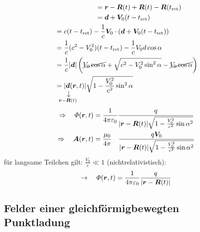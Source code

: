 \begin{enumerate}[i)]
\begin{align*}
	& \qquad \qquad \qquad = \vec{r} - \vec{R}(t) + \vec{R}(t) - \vec{R}(t_{\tx{ret}}) \\ & \qquad \qquad \qquad = \vec{d} + \vec{V}_0 (t - t_{\tx{ret}})\\
	&= c(t - t_{\tx{ret}}) - \frac{1}{c} \vec{V}_0 \cdot (\vec{d} + \vec{V}_0 (t - t_{\tx{ret}}))\\
	&= \frac{1}{c} (c^2 - V_0^2) (t - t_{\tx{ret}}) - \frac{1}{c} V_0 d \cos \alpha\\
	&= \frac{1}{c} |\vec{d}| \left(\cancel{ V_0 \cos \alpha} + \sqrt{c^2 - V_0^2 \sin^2 \alpha} - \cancel{ V_0 \cos \alpha}\right)\\
	&= |\custo{\rightarrow}{\vec{d}}{\mathclap{\vec{r} - \vec{R}(t)}}(\vec{r},t)| \sqrt{1 - \frac{V_0^2}{c^2} \sin^2 \alpha}
	\end{align*}
	\begin{align}
	\Rightarrow \quad \Phi(\vec{r},t) &= \kq \frac{q}{|\vec{r} - \vec{R}(t)| \sqrt{1 - \frac{V_0^2}{c^2} \sin \alpha^2}}\\
	\Rightarrow \quad \vec{A}(\vec{r},t) &= \frac{\mu_0}{4 \pi} \ \ \ \frac{q \vec{V}_0}{|\vec{r} - \vec{R}(t)| \sqrt{1 - \frac{V_0^2}{c^2} \sin \alpha^2}}
	\end{align}
	für langsame Teilchen gilt: $ \frac{V_0}{c} \ll 1 $ (nichtrelativistisch):
	\begin{equation*}
	\rightarrow \quad \varPhi(\bm{r},t) = \frac{1}{4\pi\varepsilon_0} \frac{q}{|\bm{r} - \bm{R}(t)|}
	\end{equation*}
\end{enumerate}

\subsection{Felder einer gleichförmigbewegten Punktladung}

